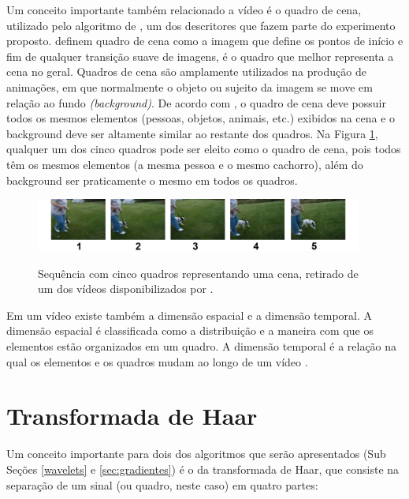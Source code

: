       Um conceito importante também relacionado a vídeo é o quadro de cena, utilizado pelo algoritmo de , um dos descritores que fazem parte do experimento proposto.  definem quadro de cena como a imagem que define os pontos de início e fim de qualquer transição suave de imagens, é o quadro que melhor representa a cena no geral. Quadros de cena são amplamente utilizados na produção de animações, em que normalmente o objeto ou sujeito da imagem se move em relação ao fundo \textit{(background)}. De acordo com , o quadro de cena deve possuir todos os mesmos elementos (pessoas, objetos, animais, etc.) exibidos na cena e o background deve ser altamente similar ao restante dos quadros. Na Figura \ref{fig:quadro_cena}, qualquer um dos cinco quadros pode ser eleito como o quadro de cena, pois todos têm os mesmos elementos (a mesma pessoa e o mesmo cachorro), além do background ser praticamente o mesmo em todos os quadros.

 \begin{figure}[!htb]
      \centering
      \caption{Sequência com cinco quadros representando uma cena, retirado de um dos vídeos disponibilizados por \cite{reddy2013recognizing}.}
       \includegraphics[width=0.96\textwidth]{dados/figuras/keyframe.png}
      \label{fig:quadro_cena}
    \end{figure}   
    

    
    Em um vídeo existe também a dimensão espacial e a dimensão temporal. A dimensão espacial é classificada como a distribuição e a maneira com que os elementos estão organizados em um quadro. A dimensão temporal é a relação na qual os elementos e os quadros mudam ao longo de um vídeo \cite{hampapur2001comparison}.
    
\section{Transformada de Haar}

Um conceito importante para dois dos algoritmos que serão apresentados (Sub Seções  \ref{wavelets} e \ref{sec:gradientes}) é o da transformada de Haar, que consiste na separação de um sinal (ou quadro, neste caso) em quatro partes: 


